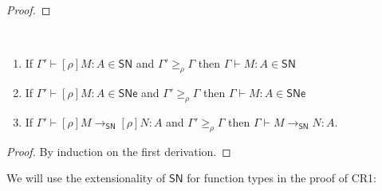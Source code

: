 \documentclass{article}
\newcommand{\ext}[1]{\geq_{#1}}
\newcommand{\SN}{\mathsf{SN}}
\newcommand{\SNe}{\mathsf{SNe}}
\newcommand{\CR}{\textsf{CR}}
\newcommand{\redSN}{\longrightarrow_\SN}
\begin{document}
\begin{proof}
\end{proof}

\begin{lemma}~\label{lm:anti-renameSN}
  \begin{enumerate}
  \item If $\Gamma' \vdash [\rho]M : A \in \SN$ and $\Gamma' \ext{\rho} \Gamma$ then $\Gamma \vdash M : A \in \SN$
  \item If $\Gamma' \vdash [\rho]M : A \in \SNe$ and $\Gamma' \ext{\rho} \Gamma$ then $\Gamma \vdash M : A \in \SNe$
  \item If $\Gamma' \vdash [\rho]M \redSN [\rho]N : A$ and $\Gamma' \ext{\rho} \Gamma$ then $\Gamma \vdash M \redSN N : A$.
  \end{enumerate}
\end{lemma}
\begin{proof}
By induction on the first derivation.
\end{proof}


We will use the extensionality of $\SN$ for function types in the proof of \CR1:
\end{document}
